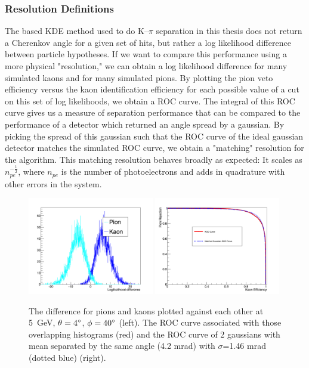 \subsubsection*{Resolution Definitions}
\label{app:resolution}
The \deltall based KDE method used to do K--$\pi$ separation in this thesis does not return a Cherenkov angle for a given set of hits, but rather a log likelihood difference between particle hypotheses.  If we want to compare this performance using a more physical "resolution," we can obtain a log likelihood difference for many simulated kaons and for many simulated pions.  By plotting the pion veto efficiency versus the kaon identification efficiency for each possible value of a cut on this set of log likelihoods, we obtain a ROC curve.  The integral of this ROC curve gives us a measure of separation performance that can be compared to the performance of a detector which returned an angle spread by a gaussian.  By picking the spread of this gaussian such that the ROC curve of the ideal gaussian detector matches the simulated \deltall ROC curve, we obtain a "matching" resolution for the algorithm.  This matching resolution behaves broadly as expected:  It scales as ${n_{pe}^{-\frac{1}{2}}}$, where $n_{pe}$ is the number of photoelectrons and adds in quadrature with other errors in the system.

\begin{figure}[!h]
\centering
\includegraphics[width=0.49\textwidth]{pics/overlap_5_4_40.pdf}
\includegraphics[width=0.49\textwidth]{pics/roc_curve_overlay_5_4_40.pdf}
\caption{The \deltall difference for pions and kaons plotted against each other at 5~GeV, $\theta=4^{\circ}$, $\phi=40^{\circ}$ (left).  The ROC curve associated with those overlapping histograms (red) and the ROC curve of 2 gaussians with mean separated by the same angle (4.2 mrad) with $\sigma$=1.46 mrad (dotted blue) (right).}
\label{fig:roc_curve}
\end{figure}

